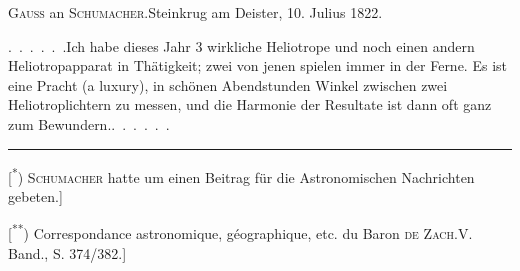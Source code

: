 \par\bigskip
\begin{center}{\large\textsc{Gauss} an \textsc{Schumacher}.\quad Steinkrug am Deister, 10. Julius 1822.}\end{center}
\par\noindent\hspace*{\parindent}.\ .\ .\ .\ .\ .\enspace Ich habe dieses Jahr 3 wirkliche Heliotrope und noch einen andern Heliotropapparat in Thätigkeit; zwei von jenen spielen immer in der Ferne. Es ist eine Pracht (a luxury), in schönen Abendstunden Winkel zwischen zwei Heliotroplichtern zu messen, und die Harmonie der Resultate ist dann oft ganz zum Bewundern.\enspace .\ .\ .\ .\ .\ .
\par\medskip\noindent\rule{4cm}{.4pt}\par
\begingroup\footnotesize
\noindent\hspace*{\parindent}[\textsuperscript{*}) \textsc{Schumacher} hatte um einen Beitrag für die Astronomischen Nachrichten gebeten.]\par
\noindent\hspace*{\parindent}[\textsuperscript{**}) Correspondance astronomique, géographique, etc. du Baron \textsc{de Zach}.\quad V. Band., S. 374/382.]\par
\endgroup

